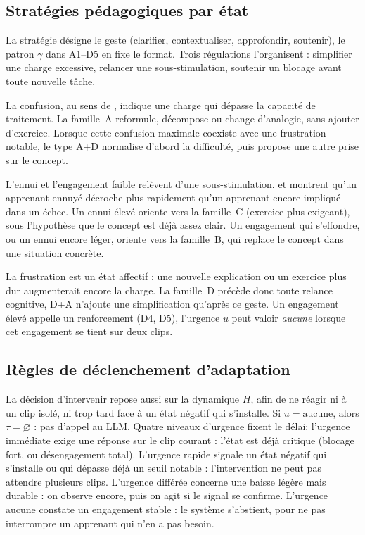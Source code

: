 \subsection{Stratégies pédagogiques par état}
\label{subsec:strategies-etat}

La stratégie désigne le geste (clarifier, contextualiser,
approfondir, soutenir), le patron $\gamma$ dans A1--D5 en fixe le
format. Trois régulations l'organisent : simplifier une charge
excessive, relancer une sous-stimulation, soutenir un blocage avant
toute nouvelle tâche.

La confusion, au sens de \textcite{sweller1988cognitive}, indique une
charge qui dépasse la capacité de traitement. La famille~A reformule,
décompose ou change d'analogie, sans ajouter d'exercice. Lorsque cette
confusion maximale coexiste avec une frustration notable, le type A+D
normalise d'abord la difficulté, puis propose une autre prise sur le
concept.

L'ennui et l'engagement faible relèvent d'une sous-stimulation.
\textcite{dmello2012dynamics} et \textcite{baker2010better} montrent
qu'un apprenant ennuyé décroche plus rapidement qu'un apprenant encore
impliqué dans un échec. Un ennui élevé oriente vers la famille~C
(exercice plus exigeant), sous l'hypothèse que le concept est déjà
assez clair. Un engagement qui s'effondre, ou un ennui encore léger,
oriente vers la famille~B, qui replace le concept dans une situation
concrète.

La frustration est un état affectif \cite{pekrun2006control} : une
nouvelle explication ou un exercice plus dur augmenterait encore la
charge. La famille~D précède donc toute relance cognitive, D+A
n'ajoute une simplification qu'après ce geste. Un engagement élevé
appelle un renforcement (D4, D5), l'urgence $u$ peut valoir
\emph{aucune} lorsque cet engagement se tient sur deux clips.



\subsection{Règles de déclenchement d'adaptation}

La décision d'intervenir repose aussi sur la dynamique $H$, afin
de ne réagir ni à un clip isolé, ni trop tard face à un état négatif
qui s'installe. Si $u = \text{aucune}$, alors
$\tau = \varnothing$ : pas d'appel au LLM.
Quatre niveaux d'urgence fixent le délai: l'urgence immédiate exige une
réponse sur le clip courant : l'état est déjà critique (blocage
fort, ou désengagement total). L'urgence rapide signale un
état négatif qui s'installe ou qui dépasse déjà un seuil notable :
l'intervention ne peut pas attendre plusieurs clips. L'urgence
différée concerne une baisse légère mais durable : on
observe encore, puis on agit si le signal se confirme. L'urgence
aucune constate un engagement stable : le système
s'abstient, pour ne pas interrompre un apprenant qui n'en a pas
besoin.


